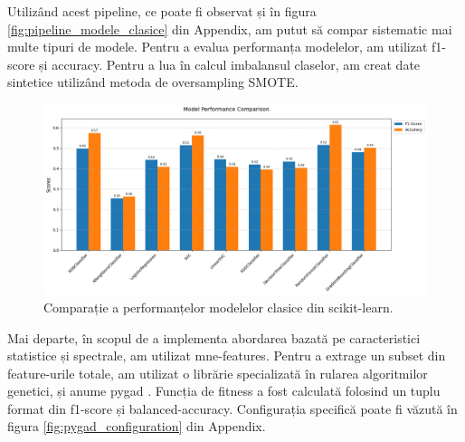 
Utilizând acest pipeline, ce poate fi observat și în figura \ref{fig:pipeline_modele_clasice} din Appendix, am putut să compar sistematic mai multe tipuri de modele. Pentru a evalua performanța modelelor, am utilizat f1-score și accuracy. Pentru a lua în calcul imbalansul claselor, am creat date sintetice utilizând metoda de oversampling SMOTE\cite{imblearn}. %

\vspace{1em}
\begin{figure}[H]
    \centering
		\vspace{-1em}
    \includegraphics[width=1\textwidth]{images/comparatie_modele_clasice_unweighted.png}
    \caption{Comparație a performanțelor modelelor clasice din scikit-learn\cite{scikit-learn}.}
		\vspace{-1em}
    \label{fig:enter-label}
\end{figure}

Mai departe, în scopul de a implementa abordarea bazată pe caracteristici statistice și spectrale, am utilizat mne-features\cite{mne-features}. Pentru a extrage un subset din feature-urile totale, am utilizat o librărie specializată în rularea algoritmilor genetici, și anume pygad \cite{pygad}. Funcția de fitness a fost calculată folosind un tuplu format din f1-score și balanced-accuracy. Configurația specifică poate fi văzută în figura \ref{fig:pygad_configuration} din Appendix.

